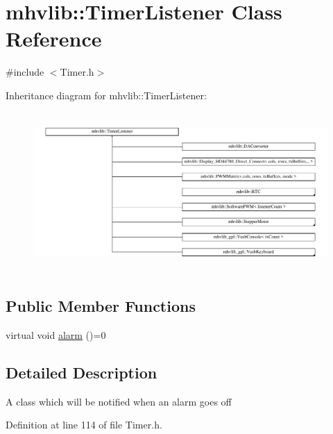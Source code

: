 \hypertarget{classmhvlib_1_1_timer_listener}{\section{mhvlib\-:\-:Timer\-Listener Class Reference}
\label{classmhvlib_1_1_timer_listener}
}


{\ttfamily \#include $<$Timer.\-h$>$}

Inheritance diagram for mhvlib\-:\-:Timer\-Listener\-:\begin{figure}[H]
\begin{center}
\leavevmode
\includegraphics[height=6.101695cm]{classmhvlib_1_1_timer_listener}
\end{center}
\end{figure}
\subsection*{Public Member Functions}
\begin{DoxyCompactItemize}
\item 
virtual void \hyperlink{classmhvlib_1_1_timer_listener_afd620e7d363a34525cd4b96827300de1}{alarm} ()=0
\end{DoxyCompactItemize}


\subsection{Detailed Description}
A class which will be notified when an alarm goes off 

Definition at line 114 of file Timer.\-h.



